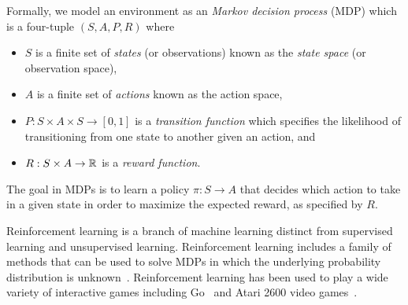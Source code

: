 Formally, we model an environment as an \emph{Markov decision process} (MDP)
which is a four-tuple $(S, A, P, R)$ where
\begin{itemize}
  \setlength\itemsep{0em}
  \item
    $S$ is a finite set of \emph{states} (or observations) known as the
    \emph{state space} (or observation space),
  \item
    $A$ is a finite set of \emph{actions} known as the action space,
  \item
    $P: S \times A \times S \to [0, 1]$ is a \emph{transition function} which
    specifies the likelihood of transitioning from one state to another given
    an action, and
  \item
    $R: S \times A \to \mathbb{R}$ is a \emph{reward function}.
\end{itemize}

The goal in MDPs is to learn a policy $\pi : S \to A$ that decides which action
to take in a given state in order to maximize the expected reward, as specified
by $R$.

Reinforcement learning is a branch of machine learning distinct from supervised
learning and unsupervised learning. Reinforcement learning includes a family of
methods that can be used to solve MDPs in which the underlying probability
distribution is unknown~\cite{sutton1998reinforcement}.  Reinforcement learning
has been used to play a wide variety of interactive games including
Go~\cite{silver2016mastering} and Atari 2600 video games~\cite{mnih2015human}.
